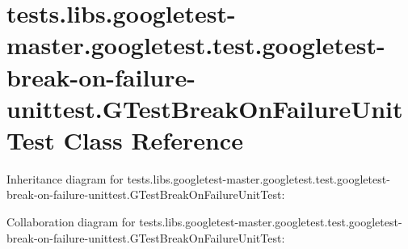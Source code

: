 \hypertarget{classtests_1_1libs_1_1googletest-master_1_1googletest_1_1test_1_1googletest-break-on-failure-uni5a549cff33ce76b1b3fe5dc8193d7468}{}\section{tests.\+libs.\+googletest-\/master.googletest.\+test.\+googletest-\/break-\/on-\/failure-\/unittest.G\+Test\+Break\+On\+Failure\+Unit\+Test Class Reference}
\label{classtests_1_1libs_1_1googletest-master_1_1googletest_1_1test_1_1googletest-break-on-failure-uni5a549cff33ce76b1b3fe5dc8193d7468}


Inheritance diagram for tests.\+libs.\+googletest-\/master.googletest.\+test.\+googletest-\/break-\/on-\/failure-\/unittest.G\+Test\+Break\+On\+Failure\+Unit\+Test\+:


Collaboration diagram for tests.\+libs.\+googletest-\/master.googletest.\+test.\+googletest-\/break-\/on-\/failure-\/unittest.G\+Test\+Break\+On\+Failure\+Unit\+Test\+:
